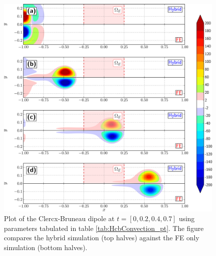 	\begin{figure}[!b]
	\showthe\columnwidth
	\centering
	\includegraphics[width=\linewidth]{./figures/hybrid/cbConv/hybrid_doubleMonopoleConvection_contourfPlots-crop.png}
	\caption{Plot of the Clercx-Bruneau dipole at $t=[0,0.2,0.4,0.7]$ using parameters tabulated in table \ref{tab:HcbConvection_pt}. The figure compares the hybrid simulation (top halves) against the FE only simulation (bottom halves).}
	\label{fig:hybrid_doubleMonopoleConvection_contourfPlots}
	\end{figure}

